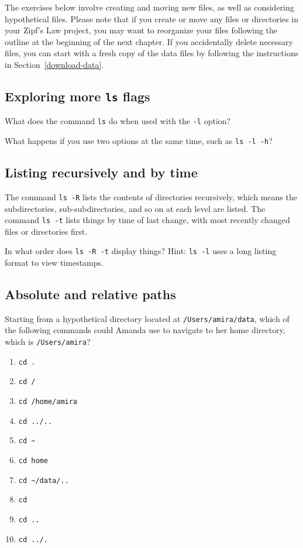 \documentclass[
]{krantz}
\providecommand{\tightlist}{%
  \setlength{\itemsep}{0pt}\setlength{\parskip}{0pt}}
\begin{document}
The exercises below involve creating and moving new files,
as well as considering hypothetical files.
Please note that if you create or move any files or directories in your Zipf's Law project,
you may want to reorganize your files following the outline at the beginning of the next chapter.
If you accidentally delete necessary files,
you can start with a fresh copy of the data files
by following the instructions in Section~\ref{download-data}.

\hypertarget{bash-basics-ex-more-ls}{%
\subsection{\texorpdfstring{Exploring more \texttt{ls} flags}{Exploring more ls flags}}\label{bash-basics-ex-more-ls}}

What does the command \texttt{ls} do when used
with the \texttt{-l} option?

What happens if you use two options at the same time, such as \texttt{ls\ -l\ -h}?

\hypertarget{bash-basics-ex-ls-rt}{%
\subsection{Listing recursively and by time}\label{bash-basics-ex-ls-rt}}

The command \texttt{ls\ -R} lists the contents of directories recursively,
which means the subdirectories, sub-subdirectories, and so on at each level are listed.
The command \texttt{ls\ -t} lists things by time of last change,
with most recently changed files or directories first.

In what order does \texttt{ls\ -R\ -t} display things? Hint: \texttt{ls\ -l} uses a long listing
format to view timestamps.

\hypertarget{bash-basics-ex-paths}{%
\subsection{Absolute and relative paths}\label{bash-basics-ex-paths}}

Starting from a hypothetical directory located at \texttt{/Users/amira/data},
which of the following commands could Amanda use to navigate to her home directory,
which is \texttt{/Users/amira}?

\begin{enumerate}
\def\labelenumi{\arabic{enumi}.}
\tightlist
\item
  \texttt{cd\ .}
\item
  \texttt{cd\ /}
\item
  \texttt{cd\ /home/amira}
\item
  \texttt{cd\ ../..}
\item
  \texttt{cd\ \textasciitilde{}}
\item
  \texttt{cd\ home}
\item
  \texttt{cd\ \textasciitilde{}/data/..}
\item
  \texttt{cd}
\item
  \texttt{cd\ ..}
\item
  \texttt{cd\ ../.}
\end{enumerate}
\end{document}
